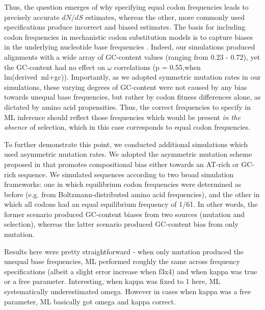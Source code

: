 \documentclass[11pt]{article}
\begin{document}

Thus, the question emerges of why specifying equal codon frequencies leads to precisely accurate $dN/dS$ estimates, whereas the other, more commonly used specifications produce incorrect and biased estimates. The basis for including codon frequencies in mechanistic codon substitution models is to capture biases in the underlying nucleotide base frequencies \cite{YN00, Yang2006}. Indeed, our simulations produced alignments with a wide array of GC-content values (ranging from 0.23 - 0.72), yet the GC-content had no effect on $\omega$ correlations (p = 0.55,when lm(derived~ml+gc)). Importantly, as we adopted symmetric mutation rates in our simulations, these varying degrees of GC-content were not caused by any bias towards unequal base frequencies, but rather by codon fitness differences alone, as dictated by amino acid propensities. Thus, the correct frequencies to specify in ML inference should reflect those frequencies which would be present \textit{in the absence} of selection, which in this case corresponds to equal codon frequencies.

To further demonstrate this point, we conducted additional simulations which used asymmetric mutation rates. We adopted the asymmetric mutation scheme proposed in \cite{SellaHirsh2005} that promotes compositional bias either towards an AT-rich or GC-rich sequence. We simulated sequences according to two broad simulation frameworks: one in which equilibrium codon frequencies were determined as before (e.g. from Boltzmann-distributed amino acid frequencies), and the other in which all codons had an equal equilibrium frequency of 1/61. In other words, the former scenario produced GC-content biases from two sources (mutation and selection), whereas the latter scenario produced GC-content bias from only mutation.

Results here were pretty straightforward - when only mutation produced the unequal base frequencies, ML performed roughly the same across frequency specifications (albeit a slight error increase when f3x4) and when kappa was true or a free parameter. Interesting, when kappa was fixed to 1 here, ML systematically underestimated omega. However in cases when kappa was a free parameter, ML basically got omega and kappa correct. 
\end{document}
